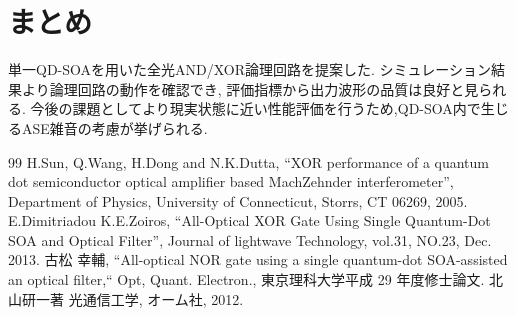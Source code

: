 \documentclass[dvipdfmx]{ujarticle}
\begin{document}
\section{まとめ}
  単一QD-SOAを用いた全光AND/XOR論理回路を提案した.
  シミュレーション結果より論理回路の動作を確認でき, 評価指標から出力波形の品質は良好と見られる.
  今後の課題としてより現実状態に近い性能評価を行うため,QD-SOA内で生じるASE雑音の考慮が挙げられる.

\begin{thebibliography} {99}
   H.Sun, Q.Wang, H.Dong and N.K.Dutta, “XOR performance of a quantum dot semiconductor optical amplifier based MachZehnder interferometer”, Department of Physics, University of Connecticut, Storrs, CT 06269, 2005.
   E.Dimitriadou K.E.Zoiros, “All-Optical XOR Gate Using Single Quantum-Dot SOA and Optical Filter”, Journal of lightwave Technology, vol.31, NO.23, Dec. 2013.
   古松 幸輔, “All-optical NOR gate using a single quantum-dot SOA-assisted an optical filter,“ Opt, Quant. Electron., 東京理科大学平成 29 年度修士論文.
   北山研一著 光通信工学, オーム社, 2012.
\end{thebibliography}
\end{document}
